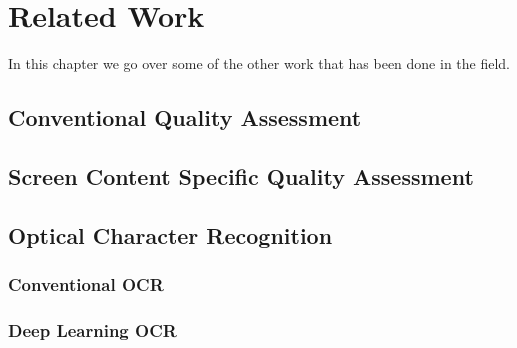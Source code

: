 \chapter{Related Work}
\label{chap:related_work}

In this chapter we go over some of the other work that has been done in the field.

\section{Conventional Quality Assessment}

\section{Screen Content Specific Quality Assessment}

\section{Optical Character Recognition}

\subsection{Conventional OCR}

\subsection{Deep Learning OCR}
